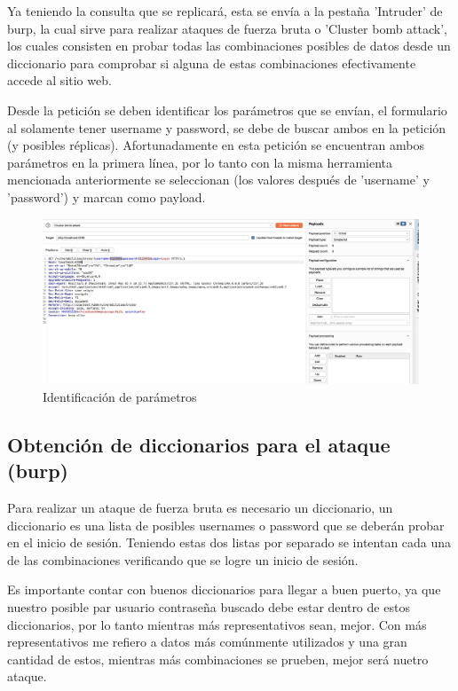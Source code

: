 \documentclass[letter,12pt]{article}
\begin{document}
Ya teniendo la consulta que se replicará, esta se envía a la pestaña 'Intruder' de burp, la cual sirve para realizar ataques de fuerza bruta o 'Cluster bomb attack', los cuales consisten en probar todas las combinaciones posibles de datos desde un diccionario para comprobar si alguna de estas combinaciones efectivamente accede al sitio web.

Desde la petición se deben identificar los parámetros que se envían, el formulario al solamente tener username y password, se debe de buscar ambos en la petición (y posibles réplicas).
Afortunadamente en esta petición se encuentran ambos parámetros en la primera línea, por lo tanto con la misma herramienta mencionada anteriormente se seleccionan (los valores después de 'username' y 'password') y marcan como payload.
\begin{figure}[H]
    \centering
    \includegraphics[width=1\linewidth]{Imagenes/brute_force_parameters.png}
    \caption{Identificación de parámetros}
    \label{fig:placeholder}
\end{figure}

\subsection{Obtención de diccionarios para el ataque (burp)}

Para realizar un ataque de fuerza bruta es necesario un diccionario, un diccionario es una lista de posibles usernames o password que se deberán probar en el inicio de sesión.
Teniendo estas dos listas por separado se intentan cada una de las combinaciones verificando que se logre un inicio de sesión.

Es importante contar con buenos diccionarios para llegar a buen puerto, ya que nuestro posible par usuario contraseña buscado debe estar dentro de estos diccionarios, por lo tanto mientras más representativos sean, mejor.
Con más representativos me refiero a datos más comúnmente utilizados y una gran cantidad de estos, mientras más combinaciones se prueben, mejor será nuetro ataque.
\end{document}

